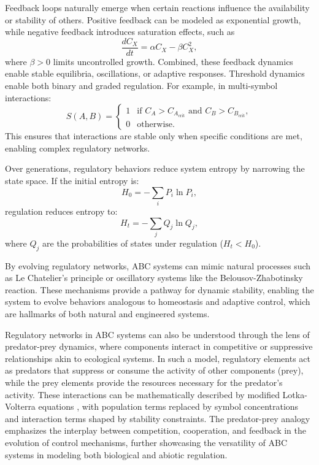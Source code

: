 \documentclass[entropy,article,submit,pdftex,moreauthors]{Definitions/mdpi}
\begin{document}
Feedback loops naturally emerge when certain reactions influence the availability or stability of others. Positive feedback can be modeled as exponential growth, while negative feedback introduces saturation effects, such as 
\[
\frac{dC_X}{dt} = \alpha C_X - \beta C_X^2,
\]
where \(\beta > 0\) limits uncontrolled growth. Combined, these feedback dynamics enable stable equilibria, oscillations, or adaptive responses. Threshold dynamics enable both binary and graded regulation. For example, in multi-symbol interactions:
\[
S(A, B) = 
\begin{cases} 
1 & \text{if } C_A > C_{A_{\text{crit}}} \text{ and } C_B > C_{B_{\text{crit}}}, \\
0 & \text{otherwise.}
\end{cases}
\]
This ensures that interactions are stable only when specific conditions are met, enabling complex regulatory networks.

Over generations, regulatory behaviors reduce system entropy by narrowing the state space. If the initial entropy is:
\[
H_0 = -\sum_{i} P_i \ln P_i,
\]
regulation reduces entropy to:
\[
H_t = -\sum_{j} Q_j \ln Q_j,
\]
where \(Q_j\) are the probabilities of states under regulation (\(H_t < H_0\)).

By evolving regulatory networks, ABC systems can mimic natural processes such as Le Chatelier's principle or oscillatory systems like the Belousov-Zhabotinsky reaction. These mechanisms provide a pathway for dynamic stability, enabling the system to evolve behaviors analogous to homeostasis and adaptive control, which are hallmarks of both natural and engineered systems.

Regulatory networks in ABC systems can also be understood through the lens of predator-prey dynamics, where components interact in competitive or suppressive relationships akin to ecological systems. In such a model, regulatory elements act as predators that suppress or consume the activity of other components (prey), while the prey elements provide the resources necessary for the predator's activity. These interactions can be mathematically described by modified Lotka-Volterra equations \cite{nowak2006evolutionary}, with population terms replaced by symbol concentrations and interaction terms shaped by stability constraints. The predator-prey analogy emphasizes the interplay between competition, cooperation, and feedback in the evolution of control mechanisms, further showcasing the versatility of ABC systems in modeling both biological and abiotic regulation.
\end{document}
